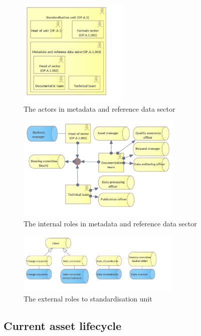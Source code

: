 	\begin{figure}[h]
		\centering
		\includegraphics[width=0.47\textwidth]{images/business/Internal Business Actors.png}
		\caption{The actors in metadata and reference data sector}
		\label{fig:actors-team}
	\end{figure} 

	\begin{figure}[h]
		\centering
		\includegraphics[width=0.7\textwidth]{images/business/Internal Roles.png}
		\caption{The internal roles in metadata and reference data sector}
		\label{fig:internal-roles}
	\end{figure}

	\begin{figure}[h]
		\centering
		\includegraphics[width=0.7\textwidth]{images/business/External Roles.png}
		\caption{The external roles to standardisation unit}
		\label{fig:external-roles}
	\end{figure} 
	
	\subsection{Current asset lifecycle}
	\label{sec:lifecycle-current}

